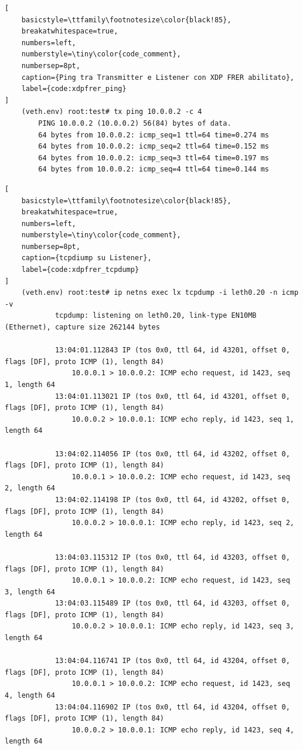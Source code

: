 \documentclass[12pt,a4paper,twoside]{book}
\begin{document}
\begin{onehalfspace}
\begin{lstlisting}[
    basicstyle=\ttfamily\footnotesize\color{black!85},
    breakatwhitespace=true,
    numbers=left,
    numberstyle=\tiny\color{code_comment},
    numbersep=8pt,
    caption={Ping tra Transmitter e Listener con XDP FRER abilitato},
    label={code:xdpfrer_ping}
]
    (veth.env) root:test# tx ping 10.0.0.2 -c 4
        PING 10.0.0.2 (10.0.0.2) 56(84) bytes of data.
        64 bytes from 10.0.0.2: icmp_seq=1 ttl=64 time=0.274 ms
        64 bytes from 10.0.0.2: icmp_seq=2 ttl=64 time=0.152 ms
        64 bytes from 10.0.0.2: icmp_seq=3 ttl=64 time=0.197 ms
        64 bytes from 10.0.0.2: icmp_seq=4 ttl=64 time=0.144 ms
\end{lstlisting}

\begin{lstlisting}[
    basicstyle=\ttfamily\footnotesize\color{black!85},
    breakatwhitespace=true,
    numbers=left,
    numberstyle=\tiny\color{code_comment},
    numbersep=8pt,
    caption={tcpdiump su Listener},
    label={code:xdpfrer_tcpdump}
]
    (veth.env) root:test# ip netns exec lx tcpdump -i leth0.20 -n icmp -v
            tcpdump: listening on leth0.20, link-type EN10MB (Ethernet), capture size 262144 bytes

            13:04:01.112843 IP (tos 0x0, ttl 64, id 43201, offset 0, flags [DF], proto ICMP (1), length 84)
                10.0.0.1 > 10.0.0.2: ICMP echo request, id 1423, seq 1, length 64
            13:04:01.113021 IP (tos 0x0, ttl 64, id 43201, offset 0, flags [DF], proto ICMP (1), length 84)
                10.0.0.2 > 10.0.0.1: ICMP echo reply, id 1423, seq 1, length 64

            13:04:02.114056 IP (tos 0x0, ttl 64, id 43202, offset 0, flags [DF], proto ICMP (1), length 84)
                10.0.0.1 > 10.0.0.2: ICMP echo request, id 1423, seq 2, length 64
            13:04:02.114198 IP (tos 0x0, ttl 64, id 43202, offset 0, flags [DF], proto ICMP (1), length 84)
                10.0.0.2 > 10.0.0.1: ICMP echo reply, id 1423, seq 2, length 64

            13:04:03.115312 IP (tos 0x0, ttl 64, id 43203, offset 0, flags [DF], proto ICMP (1), length 84)
                10.0.0.1 > 10.0.0.2: ICMP echo request, id 1423, seq 3, length 64
            13:04:03.115489 IP (tos 0x0, ttl 64, id 43203, offset 0, flags [DF], proto ICMP (1), length 84)
                10.0.0.2 > 10.0.0.1: ICMP echo reply, id 1423, seq 3, length 64

            13:04:04.116741 IP (tos 0x0, ttl 64, id 43204, offset 0, flags [DF], proto ICMP (1), length 84)
                10.0.0.1 > 10.0.0.2: ICMP echo request, id 1423, seq 4, length 64
            13:04:04.116902 IP (tos 0x0, ttl 64, id 43204, offset 0, flags [DF], proto ICMP (1), length 84)
                10.0.0.2 > 10.0.0.1: ICMP echo reply, id 1423, seq 4, length 64


\end{lstlisting}
\end{onehalfspace}
\end{document}
